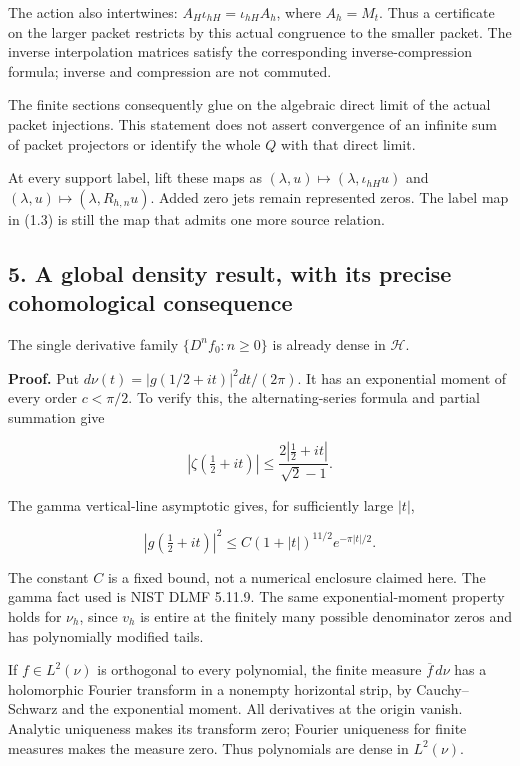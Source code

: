 \documentclass[
]{article}
\begin{document}
The action also intertwines: \(A_H\iota_{hH}=\iota_{hH}A_h\), where
\(A_h=M_t\). Thus a certificate on the larger packet restricts by this
actual congruence to the smaller packet. The inverse interpolation
matrices satisfy the corresponding inverse-compression formula; inverse
and compression are not commuted.

The finite sections consequently glue on the algebraic direct limit of
the actual packet injections. This statement does not assert convergence
of an infinite sum of packet projectors or identify the whole \(Q\) with
that direct limit.

At every support label, lift these maps as
\((\lambda,u)\mapsto(\lambda,\iota_{hH}u)\) and
\((\lambda,u)\mapsto(\lambda,R_{h,n}u)\). Added zero jets remain
represented zeros. The label map in (1.3) is still the map that admits
one more source relation.

\subsection{5. A global density result, with its precise cohomological
consequence}\label{a-global-density-result-with-its-precise-cohomological-consequence}

The single derivative family \(\{D^nf_0:n\ge0\}\) is already dense in
\(\mathcal H\).

\textbf{Proof.} Put \(d\nu(t)=|g(1/2+it)|^2dt/(2\pi)\). It has an
exponential moment of every order \(c<\pi/2\). To verify this, the
alternating-series formula and partial summation give

\[|\zeta(\tfrac12+it)|\le\frac{2|\tfrac12+it|}{\sqrt2-1}.\]

The gamma vertical-line asymptotic gives, for sufficiently large
\(|t|\),

\[|g(\tfrac12+it)|^2\le C(1+|t|)^{11/2}e^{-\pi|t|/2}.\]

The constant \(C\) is a fixed bound, not a numerical enclosure claimed
here. The gamma fact used is NIST DLMF 5.11.9. The same
exponential-moment property holds for \(\nu_h\), since \(v_h\) is entire
at the finitely many possible denominator zeros and has polynomially
modified tails.

If \(f\in L^2(\nu)\) is orthogonal to every polynomial, the finite
measure \(\overline f\,d\nu\) has a holomorphic Fourier transform in a
nonempty horizontal strip, by Cauchy--Schwarz and the exponential
moment. All derivatives at the origin vanish. Analytic uniqueness makes
its transform zero; Fourier uniqueness for finite measures makes the
measure zero. Thus polynomials are dense in \(L^2(\nu)\).
\end{document}
